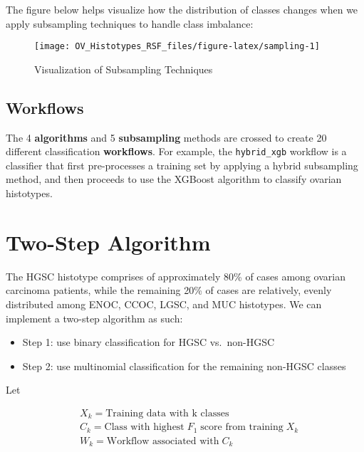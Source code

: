 \documentclass[
]{report}
\providecommand{\tightlist}{%
  \setlength{\itemsep}{0pt}\setlength{\parskip}{0pt}}
\begin{document}
The figure below helps visualize how the distribution of classes changes when we apply subsampling techniques to handle class imbalance:

\begin{figure}[H]

{\centering \texttt{[image: OV\_Histotypes\_RSF\_files/figure-latex/sampling-1]} 

}

\caption{Visualization of Subsampling Techniques}\label{fig:sampling}
\end{figure}

\subsection{Workflows}\label{workflows}

The 4 \textbf{algorithms} and 5 \textbf{subsampling} methods are crossed to create 20 different classification \textbf{workflows}. For example, the \texttt{hybrid\_xgb} workflow is a classifier that first pre-processes a training set by applying a hybrid subsampling method, and then proceeds to use the XGBoost algorithm to classify ovarian histotypes.

\section{Two-Step Algorithm}\label{two-step-algorithm}

The HGSC histotype comprises of approximately 80\% of cases among ovarian carcinoma patients, while the remaining 20\% of cases are relatively, evenly distributed among ENOC, CCOC, LGSC, and MUC histotypes. We can implement a two-step algorithm as such:

\begin{itemize}
\tightlist
\item
  Step 1: use binary classification for HGSC vs.~non-HGSC
\item
  Step 2: use multinomial classification for the remaining non-HGSC classes
\end{itemize}

Let

\[
\begin{aligned}
& X_k = \text{Training data with k classes}  \\
& C_k = \text{Class with highest}\;F_1\;\text{score from training}\;X_k \\
& W_k = \text{Workflow associated with}\;C_k
\end{aligned}
\label{eq:sequential}
\]
\end{document}
